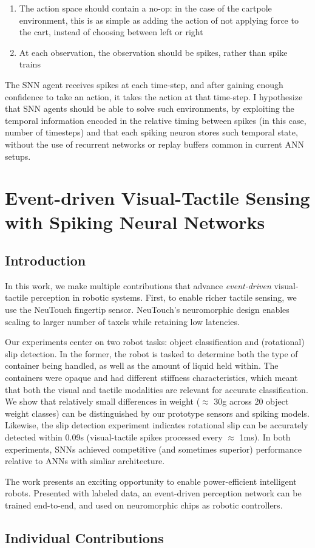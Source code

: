 \documentclass[fyp]{socreport}
\begin{document}
\begin{enumerate}
  \item The action space should contain a no-op: in the case of the cartpole
  environment, this is as simple as adding the action of not applying force to
  the cart, instead of choosing between left or right
\item At each observation, the observation should be spikes, rather than spike
trains
\end{enumerate}

The SNN agent receives spikes at each time-step, and after gaining enough
confidence to take an action, it takes the action at that time-step. I
hypothesize that SNN agents should be able to solve such environments, by
exploiting the temporal information encoded in the relative timing between
spikes (in this case, number of timesteps) and that each spiking neuron stores
such temporal state, without the use of recurrent networks or replay buffers
common in current ANN setups.

\chapter{Event-driven Visual-Tactile Sensing with Spiking Neural Networks\label{cha:vtsnn}}

\section{Introduction}

In this work, we make multiple contributions that advance \emph{event-driven} visual-tactile perception in robotic systems. First, to enable richer tactile sensing, we use the NeuTouch fingertip sensor. NeuTouch's neuromorphic design enables scaling to larger number of taxels while retaining low latencies.

Our experiments center on two robot tasks: object classification and (rotational) slip detection. In the former, the robot is tasked to determine both the type of container being handled, as well as the amount of liquid held within. The containers were opaque and had different stiffness characteristics, which meant that both the visual and tactile modalities are relevant for accurate classification. We show that relatively small differences in weight ($\approx$ 30g across 20 object weight classes) can be distinguished by our prototype sensors and spiking models. Likewise, the slip detection experiment indicates rotational slip can be accurately detected within 0.09s (visual-tactile spikes processed every $\approx$ 1ms). In both experiments, SNNs achieved competitive (and sometimes superior) performance relative to ANNs with simliar architecture.

The work presents an exciting opportunity to enable power-efficient intelligent robots. Presented with labeled data, an event-driven perception network can be trained end-to-end, and used on  neuromorphic chips as robotic controllers.

\section{Individual Contributions}




\appendix
\end{document}
